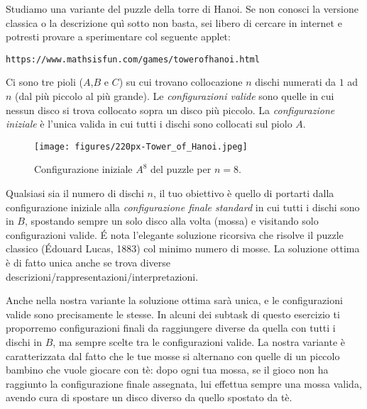 \renewcommand{\nomebreve}{hanoi\_with\_toddler}
\renewcommand{\titolo}{Playing the Hanoi puzzle with a toddler\\}

\introduzione{}

Studiamo una variante del puzzle della torre di Hanoi. Se non conosci la versione classica o la descrizione quì sotto non basta, sei libero di cercare in internet e potresti provare a sperimentare col seguente applet:

\begin{verbatim}
https://www.mathsisfun.com/games/towerofhanoi.html
\end{verbatim}

Ci sono tre pioli ($A$,$B$ e $C$) su cui trovano collocazione $n$ dischi numerati da $1$ ad $n$ (dal più piccolo al più grande). Le \emph{configurazioni valide} sono quelle in cui nessun disco si trova collocato sopra un disco più piccolo.
La \emph{configurazione iniziale} è l'unica valida in cui tutti i dischi sono collocati sul piolo $A$.

\begin{figure}[h!]
\begin{center}
  \noindent \texttt{[image: figures/220px-Tower\_of\_Hanoi.jpeg]}
\end{center}
\caption{Configurazione iniziale $A^8$ del puzzle per $n=8$.}
\end{figure}

Qualsiasi sia il numero di dischi $n$, il tuo obiettivo è quello di portarti dalla configurazione iniziale alla \emph{configurazione finale standard} in cui tutti i dischi sono in $B$, spostando sempre un solo disco alla volta (mossa) e visitando solo configurazioni valide.
\'E nota l'elegante soluzione ricorsiva che risolve il puzzle classico (Édouard Lucas, 1883) col minimo numero di mosse. La soluzione ottima è di fatto unica anche se trova diverse descrizioni/rappresentazioni/interpretazioni.

Anche nella nostra variante la soluzione ottima sarà unica, e le configurazioni valide sono precisamente le stesse. In alcuni dei subtask di questo esercizio ti proporremo configurazioni finali da raggiungere diverse da quella con tutti i dischi in $B$, ma sempre scelte tra le configurazioni valide. La nostra variante è caratterizzata dal fatto che le tue mosse si alternano con quelle di un piccolo bambino che vuole giocare con tè: dopo ogni tua mossa, se il gioco non ha raggiunto la configurazione finale assegnata, lui effettua sempre una mossa valida, avendo cura di spostare un disco diverso da quello spostato da tè.\\

